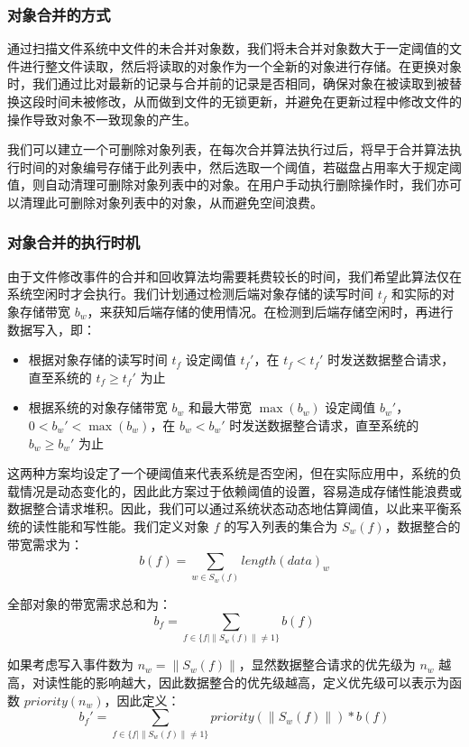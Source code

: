 \subsubsection{对象合并的方式}
通过扫描文件系统中文件的未合并对象数，我们将未合并对象数大于一定阈值的文件进行整文件读取，然后将读取的对象作为一个全新的对象进行存储。在更换对象时，我们通过比对最新的记录与合并前的记录是否相同，确保对象在被读取到被替换这段时间未被修改，从而做到文件的无锁更新，并避免在更新过程中修改文件的操作导致对象不一致现象的产生。

我们可以建立一个可删除对象列表，在每次合并算法执行过后，将早于合并算法执行时间的对象编号存储于此列表中，然后选取一个阈值，若磁盘占用率大于规定阈值，则自动清理可删除对象列表中的对象。在用户手动执行删除操作时，我们亦可以清理此可删除对象列表中的对象，从而避免空间浪费。
\subsubsection{对象合并的执行时机}
由于文件修改事件的合并和回收算法均需要耗费较长的时间，我们希望此算法仅在系统空闲时才会执行。我们计划通过检测后端对象存储的读写时间 $t_{f}$ 和实际的对象存储带宽 $b_{w}$，来获知后端存储的使用情况。在检测到后端存储空闲时，再进行数据写入，即：

\begin{itemize}
\item 根据对象存储的读写时间 $t_{f}$ 设定阈值 $t_{f}'$，在 $t_{f}<t_{f}'$ 时发送数据整合请求，直至系统的 $t_{f} \geq t_{f}'$ 为止
\item 根据系统的对象存储带宽 $b_{w}$ 和最大带宽 $\max(b_{w})$ 设定阈值 $b_{w}'$，$0<b_{w}'<\max(b_{w})$，在 $b_{w}<b_{w}'$ 时发送数据整合请求，直至系统的 $b_{w} \geq b_{w}'$ 为止
\end{itemize}

这两种方案均设定了一个硬阈值来代表系统是否空闲，但在实际应用中，系统的负载情况是动态变化的，因此此方案过于依赖阈值的设置，容易造成存储性能浪费或数据整合请求堆积。因此，我们可以通过系统状态动态地估算阈值，以此来平衡系统的读性能和写性能。我们定义对象 $f$ 的写入列表的集合为 $S_{w}(f)$，数据整合的带宽需求为：
\begin{equation}
b(f)=\sum_{w{\in}S_{w}(f)}length(data)_{w}
\end{equation}

全部对象的带宽需求总和为：
\begin{equation}
b_{f}=\sum_{f{\in}\{f|\|S_{w}(f)\|{\ne}1\}}b(f)
\end{equation}

如果考虑写入事件数为 $n_{w}=\|S_{w}(f)\|$，显然数据整合请求的优先级为 $n_{w}$ 越高，对读性能的影响越大，因此数据整合的优先级越高，定义优先级可以表示为函数 $priority(n_{w})$，因此定义：
\begin{equation}
b_{f}'=\sum_{f{\in}\{f|\|S_{w}(f)\|{\ne}1\}}priority(\|S_{w}(f)\|)*b(f)
\end{equation}

